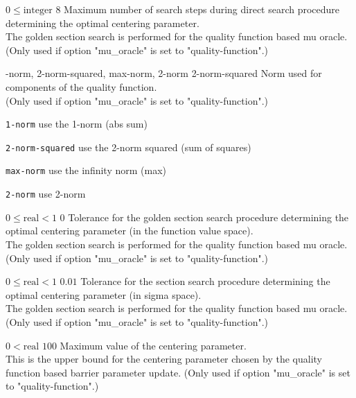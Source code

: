 %
{$0\leq\textrm{integer}$}%
{$8$}%
{Maximum number of search steps during direct search procedure determining the optimal centering parameter.\\
The golden section search is performed for the quality function based mu oracle. (Only used if option "mu\_oracle" is set to "quality-function".)}%
{}

%
{-norm, 2-norm-squared, max-norm, 2-norm}%
{2-norm-squared}%
{Norm used for components of the quality function.\\
(Only used if option "mu\_oracle" is set to "quality-function".)}%
{\begin{list}{}{
\setlength{\parsep}{0em}
\setlength{\leftmargin}{5ex}
\setlength{\labelwidth}{2ex}
\setlength{\itemindent}{0ex}
\setlength{\topsep}{0pt}}
\item[\texttt{1-norm}] use the 1-norm (abs sum)
\item[\texttt{2-norm-squared}] use the 2-norm squared (sum of squares)
\item[\texttt{max-norm}] use the infinity norm (max)
\item[\texttt{2-norm}] use 2-norm
\end{list}
}

%
{$0\leq\textrm{real}<1$}%
{$0$}%
{Tolerance for the golden section search procedure determining the optimal centering parameter (in the function value space).\\
The golden section search is performed for the quality function based mu oracle. (Only used if option "mu\_oracle" is set to "quality-function".)}%
{}

%
{$0\leq\textrm{real}<1$}%
{$0.01$}%
{Tolerance for the section search procedure determining the optimal centering parameter (in sigma space).\\
The golden section search is performed for the quality function based mu oracle. (Only used if option "mu\_oracle" is set to "quality-function".)}%
{}

%
{$0<\textrm{real}$}%
{$100$}%
{Maximum value of the centering parameter.\\
This is the upper bound for the centering parameter chosen by the quality function based barrier parameter update. (Only used if option "mu\_oracle" is set to "quality-function".)}%
{}

